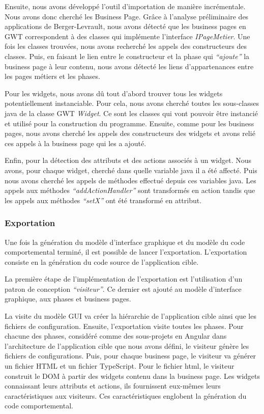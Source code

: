 \documentclass[11pt,]{article}
\begin{document}
Ensuite, nous avons développé l'outil d'importation de manière
incrémentale. Nous avons donc cherché les Business Page. Grâce à
l'analyse préliminaire des applications de Berger-Levrault, nous avons
détecté que les business pages en GWT correspondent à des classes qui
implémente l'interface \emph{IPageMetier}. Une fois les classes
trouvées, nous avons recherché les appels des constructeurs des classes.
Puis, en faisant le lien entre le constructeur et la phase qui
\emph{``ajoute''} la business page à leur contenu, nous avons détecté
les liens d'appartenances entre les pages métiers et les phases.

Pour les widgets, nous avons dû tout d'abord trouver tous les widgets
potentiellement instanciable. Pour cela, nous avons cherché toutes les
sous-classes java de la classe GWT \emph{Widget}. Ce sont les classes
qui vont pouvoir être instancié et utilisé pour la construction du
programme. Ensuite, comme pour les business pages, nous avons cherché
les appels des constructeurs des widgets et avons relié ces appels à la
business page qui les a ajouté.

Enfin, pour la détection des attributs et des actions associés à un
widget. Nous avons, pour chaque widget, cherché dans quelle variable
java il a été affecté. Puis nous avons cherché les appels de méthodes
effectué depuis ces variables java. Les appels aux méthodes
\emph{``addActionHandler''} sont transformés en action tandis que les
appels aux méthodes \emph{``setX''} ont été transformé en attribut.

\hypertarget{exportation}{%
\subsubsection{Exportation}\label{exportation}}

Une fois la génération du modèle d'interface graphique et du modèle du
code comportemental terminé, il est possible de lancer l'exportation.
L'exportation consiste en la génération du code source de l'application
cible.

La première étape de l'implémentation de l'exportation est l'utilisation
d'un patron de conception \emph{``visiteur''}. Ce dernier est ajouté au
modèle d'interface graphique, aux phases et business pages.

La visite du modèle GUI va créer la hiérarchie de l'application cible
ainsi que les fichiers de configuration. Ensuite, l'exportation visite
toutes les phases. Pour chacune des phases, considéré comme des
sous-projets en Angular dans l'architecture de l'application cible que
nous avons défini, le visiteur génère les fichiers de configurations.
Puis, pour chaque business page, le visiteur va générer un fichier HTML
et un fichier TypeScript. Pour le fichier html, le visiteur construit le
DOM à partir des widgets contenu dans la business page. Les widgets
connaissant leurs attributs et actions, ils fournissent eux-mêmes leurs
caractéristiques aux visiteurs. Ces caractéristiques englobent la
génération du code comportemental.
\end{document}
